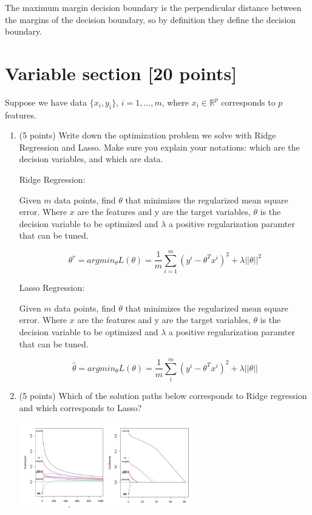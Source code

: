 \documentclass[a4paper,12pt,fleqn]{article}
\begin{document}
\vspace{.15in}
The maximum margin decision boundary is the perpendicular distance between the margins of the decision boundary, so by definition they define the decision boundary.
\vspace{.15in}

\clearpage

\section{Variable section [20 points]}

Suppose we have data $\{x_i, y_i\}$, $i = 1, \ldots, m$, where $x_i \in \mathbb R^p$ corresponds to $p$ features.


\begin{enumerate}
\item (5 points) Write down the optimization problem we solve with Ridge Regression and Lasso. Make sure you explain your notations: which are the decision variables, and which are data. 

\vspace{.15in}
Ridge Regression:

Given $m$ data points, find $\theta$ that minimizes the regularized mean square error.  Where $x$ are the features and y are the target variables, $\theta$ is the decision variable to be optimized and $\lambda$ a positive regularization paramter that can be tuned.

$$
\theta^r = argmin_{\theta}L(\theta) = \frac{1}{m}\sum_{i=1}^{m} (y^i -\theta^Tx^i)^2+\lambda||\theta||^2
$$



\vspace{.15in}
Lasso Regression:

Given $m$ data points, find $\theta$ that minimizes the regularized mean square error.  Where $x$ are the features and y are the target variables, $\theta$ is the decision variable to be optimized and $\lambda$ a positive regularization paramter that can be tuned.


$$
\hat{\theta} = argmin_{\theta}L(\theta) = \frac{1}{m}\sum_{i}^{m} (y^i -\theta^Tx^i)^2+\lambda||\theta||
$$

\vspace{.15in}

\item (5 points) Which of the solution paths below corresponds to Ridge regression and which corresponds to Lasso?
%
\begin{center}
\includegraphics[width = 0.6\textwidth]{path}
\end{center}


\end{enumerate}
\end{document}
